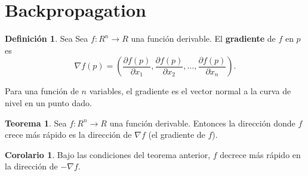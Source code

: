 \documentclass[12pt,letterpaper]{article}
\theoremstyle{definition}
\newtheorem{defi}{Definici\'on}[section]
\theoremstyle{definition}
\theoremstyle{definition}
\theoremstyle{definition}
\theoremstyle{definition}
\newtheorem{teo}{Teorema}
\theoremstyle{definition}
\newtheorem{cor}{Corolario}
\begin{document}
	\section{Backpropagation}
	\begin{defi}
		Sea Sea $ f: R^n\to R $ una función derivable. El \textbf{gradiente} de $ f $  en $ p $ es
		\[ \nabla f (p) =\left(\dfrac{\partial f(p)}{\partial x_1}, \dfrac{\partial f(p)}{\partial x_2}, \dots, \dfrac{\partial f(p)}{\partial x_n}\right). \]
	\end{defi}
	Para una función de $ n $ variables, el gradiente es el vector normal a la curva de nivel en un punto dado.
	
	\begin{teo}
		Sea $ f: R^n\to R $ una funci\'on derivable. Entonces la direcci\'on donde $ f $ crece m\'as r\'apido es la direcci\'on de $ \nabla f $ (el gradiente de $ f $).
	\end{teo}
	\begin{cor}
		Bajo las condiciones del teorema anterior, $ f $ decrece más rápido en la dirección de $ -\nabla f $.
	\end{cor}
	
\end{document}
